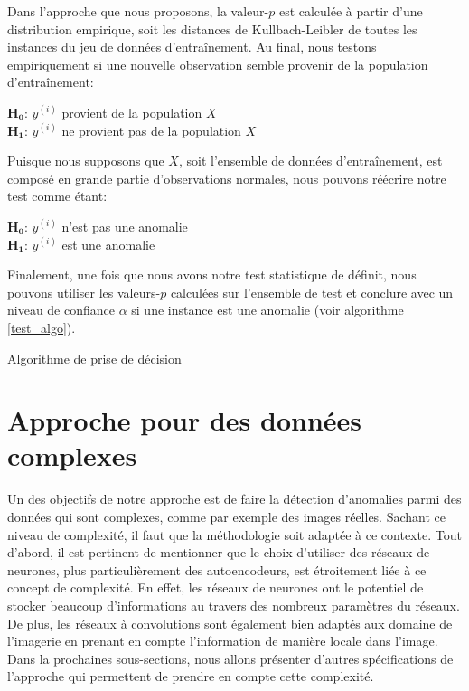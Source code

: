 Dans l'approche que nous proposons, la valeur-$p$ est calculée à partir d'une distribution empirique, soit les distances de Kullbach-Leibler de toutes les instances du jeu de données d'entraînement. Au final, nous testons empiriquement si une nouvelle observation semble provenir de la population d'entraînement:

\begin{center}
	$\boldsymbol{H_0}$: $y^{(i)}$ provient de la population $X$ \\
	$\boldsymbol{H_1}$: $y^{(i)}$ ne provient pas de la population $X$
\end{center}

\noindent Puisque nous supposons que $X$, soit l'ensemble de données d'entraînement, est composé en grande partie d'observations normales, nous pouvons réécrire notre test comme étant:

\begin{center}
	$\boldsymbol{H_0}$: $y^{(i)}$ n'est pas une anomalie \\
	$\boldsymbol{H_1}$: $y^{(i)}$ est une anomalie
\end{center}

Finalement, une fois que nous avons notre test statistique de définit, nous pouvons utiliser les valeurs-$p$ calculées sur l'ensemble de test et conclure avec un niveau de confiance $\alpha$ si une instance est une anomalie (voir algorithme \ref{test_algo}).

\begin{center}
	\begin{algorithm}[H] \label{test_algo}
		\SetAlgoLined
		\caption{Algorithme de prise de décision}
	\end{algorithm}
\end{center}

\section{Approche pour des données complexes}

Un des objectifs de notre approche est de faire la détection d'anomalies parmi des données qui sont complexes, comme par exemple des images réelles. Sachant ce niveau de complexité, il faut que la méthodologie soit adaptée à ce contexte. Tout d'abord, il est pertinent de mentionner que le choix  d'utiliser des réseaux de neurones, plus particulièrement des autoencodeurs, est étroitement liée à ce concept de complexité. En effet, les réseaux de neurones ont le potentiel de stocker beaucoup d'informations au travers des nombreux paramètres du réseaux. De plus, les réseaux à convolutions sont également bien adaptés aux domaine de l'imagerie en prenant en compte l'information de manière locale dans l'image. Dans la prochaines sous-sections, nous allons présenter d'autres spécifications de l'approche qui permettent de prendre en compte cette complexité.

